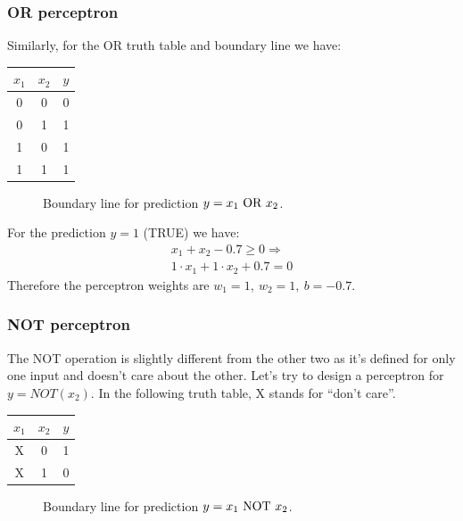 \documentclass[a4paper]{article}
\begin{document}
\subsubsection{OR perceptron}
Similarly, for the OR truth table and boundary line we have:
\begin{multicols}{2}
\begin{center}
\begin{tabular}{c|c|c}
$x_1$ & $x_2$ & $y$ \\
\hline
0 & 0 & 0 \\
0 & 1 & 1 \\
1 & 0 & 1 \\
1 & 1 & 1 
\end{tabular}
\end{center}
\columnbreak
\begin{figure}[H]
    \centering
    
    \caption{Boundary line for prediction $y=x_1 \ \textup{OR} \ x_2$.}
\end{figure}
\end{multicols}
For the prediction $y=1$ (TRUE) we have:
\begin{gather*}
   x_1 + x_2 - 0.7 \geq 0 \Rightarrow\\
   1\cdot x_1 + 1\cdot x_2 + 0.7 = 0
\end{gather*}
Therefore the perceptron weights are $w_1=1, \ w_2 = 1, \ b = -0.7$.

\subsubsection{NOT perceptron}
The NOT operation is slightly different from the other two as it's defined for only one input and doesn't care about the other. Let's try to design a perceptron for $y=NOT(x_2)$. In the following truth table, X stands for ``don't care''.
\begin{multicols}{2}
\begin{center}
\begin{tabular}{c|c|c}
$x_1$ & $x_2$ & $y$ \\
\hline
X & 0 & 1 \\
X & 1 & 0
\end{tabular}
\end{center}
\columnbreak

\begin{figure}[H]
    \centering
    
    \caption{Boundary line for prediction $y=x_1 \ \textup{NOT} \ x_2$.}
\end{figure}
\end{multicols}
\end{document}
